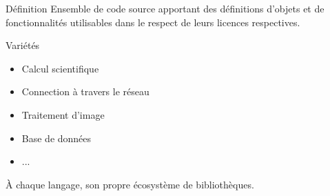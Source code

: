 \begin{frame}{Définition}
    Ensemble de code source apportant des définitions d'objets et de fonctionnalités utilisables dans le respect de leurs licences respectives.
\end{frame}

\begin{frame}{Variétés}
    \begin{itemize}
        \item Calcul scientifique
        \item Connection à travers le réseau
        \item Traitement d'image
        \item Base de données
        \item ...
    \end{itemize}
    À chaque langage, son propre écosystème de bibliothèques.
\end{frame}
